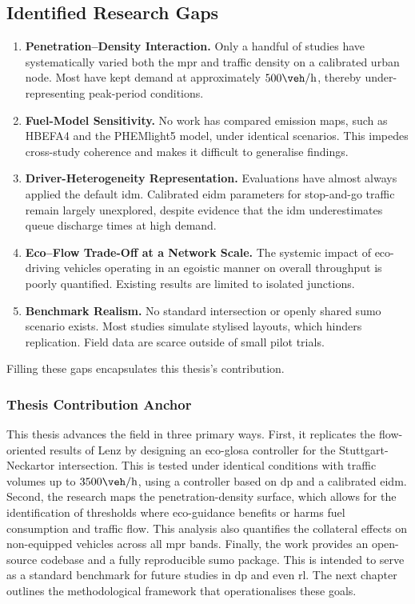 \subsection{Identified Research Gaps}
\begin{enumerate}
    \item \textbf{Penetration–Density Interaction.} Only a handful of studies have systematically varied both the \ac{mpr} and traffic density on a calibrated urban node. Most have kept demand at approximately $500\unit{\veh\per\hour}$, thereby under-representing peak-period conditions.
    \item \textbf{Fuel-Model Sensitivity.} No work has compared emission maps, such as HBEFA4 and the PHEMlight5 model, under identical scenarios. This impedes cross-study coherence and makes it difficult to generalise findings.
    \item \textbf{Driver-Heterogeneity Representation.} Evaluations have almost always applied the default \ac{idm}. Calibrated \ac{eidm} parameters for stop-and-go traffic remain largely unexplored, despite evidence that the \ac{idm} underestimates queue discharge times at high demand.
    \item \textbf{Eco–Flow Trade-Off at a Network Scale.} The systemic impact of eco-driving vehicles operating in an egoistic manner on overall throughput is poorly quantified. Existing results are limited to isolated junctions.
    \item \textbf{Benchmark Realism.} No standard intersection or openly shared \ac{sumo} scenario exists. Most studies simulate stylised layouts, which hinders replication. Field data are scarce outside of small pilot trials.
\end{enumerate}
Filling these gaps encapsulates this thesis's contribution.

\subsubsection{Thesis Contribution Anchor}
\label{subsubsec:thesis_contribution_anchor}

This thesis advances the field in three primary ways. First, it replicates the flow-oriented results of Lenz \cite{Lenz2024} by designing an \ac{eco-glosa} controller for the Stuttgart-Neckartor intersection. This is tested under identical conditions with traffic volumes up to $3500\unit{\veh\per\hour}$, using a controller based on \ac{dp} and a calibrated \ac{eidm}. Second, the research maps the penetration-density surface, which allows for the identification of thresholds where eco-guidance benefits or harms fuel consumption and traffic flow. This analysis also quantifies the collateral effects on non-equipped vehicles across all \ac{mpr} bands. Finally, the work provides an open-source codebase and a fully reproducible \ac{sumo} package. This is intended to serve as a standard benchmark for future studies in \ac{dp} and even \ac{rl}.
\mynewline
The next chapter outlines the methodological framework that operationalises these goals.